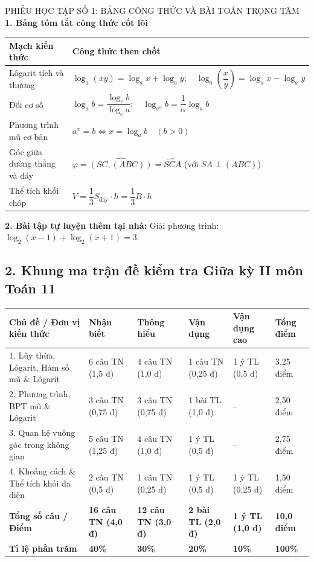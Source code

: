 \documentclass[12pt, a4paper]{article}
\begin{document}
\begin{itemize}[leftmargin=1.2cm]
\begin{pedabox}{PHIẾU HỌC TẬP SỐ 1: BẢNG CÔNG THỨC VÀ BÀI TOÁN TRỌNG TÂM}
    \textbf{1. Bảng tóm tắt công thức cốt lõi}
    \begin{center}
    \begin{tabular}{|l|l|}
    \hline
    \textbf{Mạch kiến thức} & \textbf{Công thức then chốt} \\ \hline
    Lôgarit tích và thương & $\log_a (xy) = \log_a x + \log_a y; \quad \log_a \left(\dfrac{x}{y}\right) = \log_a x - \log_a y$ \\ \hline
    Đổi cơ số & $\log_a b = \dfrac{\log_c b}{\log_c a}; \quad \log_{a^\alpha} b = \dfrac{1}{\alpha} \log_a b$ \\ \hline
    Phương trình mũ cơ bản & $a^x = b \iff x = \log_a b \quad (b > 0)$ \\ \hline
    Góc giữa đường thẳng và đáy & $\varphi = \widehat{(SC, (ABC))} = \widehat{SCA}$ (với $SA \perp (ABC)$) \\ \hline
    Thể tích khối chóp & $V = \dfrac{1}{3} S_{\text{đáy}} \cdot h = \dfrac{1}{3} B \cdot h$ \\ \hline
    \end{tabular}
    \end{center}

    \textbf{2. Bài tập tự luyện thêm tại nhà:}
    Giải phương trình: $\log_2 (x - 1) + \log_2 (x + 1) = 3$. \dotfill
\end{pedabox}

\subsection*{2. Khung ma trận đề kiểm tra Giữa kỳ II môn Toán 11}

\begin{center}
\begin{tabularx}{\textwidth}{|p{4.5cm}|X|X|X|X|X|}
\hline
\textbf{Chủ đề / Đơn vị kiến thức} & \textbf{Nhận biết} & \textbf{Thông hiểu} & \textbf{Vận dụng} & \textbf{Vận dụng cao} & \textbf{Tổng điểm} \\ \hline
1. Lũy thừa, Lôgarit, Hàm số mũ \& Lôgarit & 6 câu TN (1,5 đ) & 4 câu TN (1,0 đ) & 1 câu TN (0,25 đ) & 1 ý TL (0,5 đ) & 3,25 điểm \\ \hline
2. Phương trình, BPT mũ \& Lôgarit & 3 câu TN (0,75 đ) & 3 câu TN (0,75 đ) & 1 bài TL (1,0 đ) & – & 2,50 điểm \\ \hline
3. Quan hệ vuông góc trong không gian & 5 câu TN (1,25 đ) & 4 câu TN (1,0 đ) & 1 ý TL (0,5 đ) & – & 2,75 điểm \\ \hline
4. Khoảng cách \& Thể tích khối đa diện & 2 câu TN (0,5 đ) & 1 câu TN (0,25 đ) & 1 ý TL (0,5 đ) & 1 ý TL (0,25 đ) & 1,50 điểm \\ \hline
\textbf{Tổng số câu / Điểm} & \textbf{16 câu TN (4,0 đ)} & \textbf{12 câu TN (3,0 đ)} & \textbf{2 bài TL (2,0 đ)} & \textbf{1 ý TL (1,0 đ)} & \textbf{10,0 điểm} \\ \hline
\textbf{Tỉ lệ phần trăm} & \textbf{40\%} & \textbf{30\%} & \textbf{20\%} & \textbf{10\%} & \textbf{100\%} \\ \hline
\end{tabularx}
\end{center}


\end{itemize}
\end{document}
